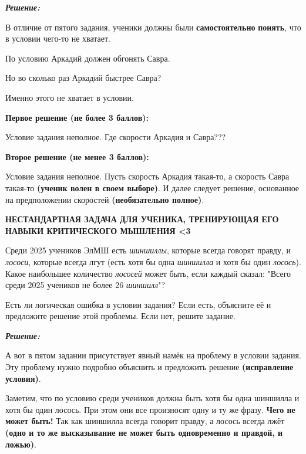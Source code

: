 \hspace{3mm}

\centerline{\textbf{\textit{Решение:}}}

В отличие от пятого задания, ученики должны были \textbf{самостоятельно} \textbf{понять}, что в условии чего-то не хватает.

\newpage
\hspace{3mm}

По условию Аркадий должен обгонять Савра.


Но во сколько раз Аркадий быстрее Савра?

Именно этого не хватает в условии.

\textbf{Первое решение (не более 3 баллов):}

Условие задания неполное. Где скорости Аркадия и Савра???

\textbf{Второе решение (не менее 3 баллов):}

Условие задания неполное. Пусть скорость Аркадия такая-то, а скорость Савра такая-то \textbf{(ученик волен в своем выборе)}. И далее следует решение, основанное на предположении скоростей \textbf{(необязательно полное)}.

\textbf{НЕСТАНДАРТНАЯ ЗАДАЧА ДЛЯ УЧЕНИКА, ТРЕНИРУЮЩАЯ ЕГО НАВЫКИ КРИТИЧЕСКОГО МЫШЛЕНИЯ <3}



\hspace{3mm}



 Среди 2025 учеников ЭлМШ есть \textit{шиншиллы}, которые всегда говорят правду, и \textit{лососи}, которые всегда лгут (есть хотя бы одна \textit{шиншилла} и хотя бы один \textit{лосось}). Какое наибольшее количество \textit{лососей} может быть, если каждый сказал: "Всего среди 2025 учеников не более 26 \textit{шиншилл}"?

Есть ли логическая ошибка в условии задания? Если есть, объясните её и предложите решение этой проблемы. Если нет, решите задание.

\hspace{3mm}

\centerline{\textbf{\textit{Решение:}}}

А вот в пятом задании присутствует явный намёк на проблему в условии задания. Эту проблему нужно подробно объяснить и предложить решение \textbf{(исправление условия)}.

Заметим, что по условию среди учеников должна быть хотя бы одна шиншилла и хотя бы один лосось. При этом они все произносят одну и ту же фразу. \textbf{Чего не может быть!} Так как шиншилла всегда говорит правду, а лосось всегда лжёт \textbf{(одно и то же высказывание не может быть одновременно и правдой, и ложью)}.


